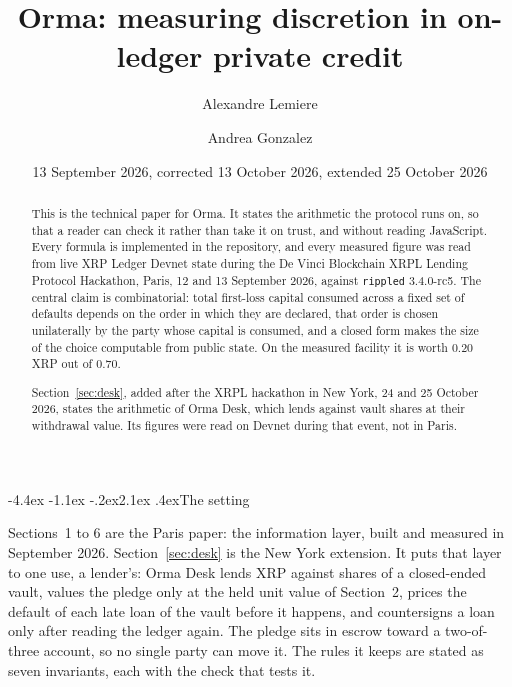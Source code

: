\documentclass[11pt]{article}
\title{Orma: measuring discretion in on-ledger private credit}
\author{Alexandre Lemiere \and Andrea Gonzalez}
\date{13 September 2026, corrected 13 October 2026, extended 25 October 2026}
\makeatletter
\renewcommand\section{\@startsection{section}{1}{\z@}%
  {-4.4ex \@plus -1.1ex \@minus -.2ex}{2.1ex \@plus .4ex}{\normalfont\Large\bfseries}}
\theoremstyle{orma}
\theoremstyle{ormaupright}
\makeatother
\begin{document}
\maketitle

\begin{abstract}
\noindent
This is the technical paper for Orma. It states the arithmetic the protocol runs on, so that
a reader can check it rather than take it on trust, and without reading JavaScript. Every formula is implemented in the repository, and every
measured figure was read from live XRP Ledger Devnet state during the De Vinci Blockchain
XRPL Lending Protocol Hackathon, Paris, 12 and 13 September 2026, against \texttt{rippled}
3.4.0-rc5. The central claim is combinatorial: total first-loss capital consumed across a
fixed set of defaults depends on the order in which they are declared, that order is chosen
unilaterally by the party whose capital is consumed, and a closed form makes the size of the
choice computable from public state. On the measured facility it is worth $0.20$ XRP out of
$0.70$.

Section~\ref{sec:desk}, added after the XRPL hackathon in New York, 24 and 25 October 2026,
states the arithmetic of Orma Desk, which lends against vault shares at their withdrawal
value. Its figures were read on Devnet during that event, not in Paris.
\end{abstract}

\clearpage

\section{The setting}

Sections~1 to 6 are the Paris paper: the information layer, built and measured in September
2026. Section~\ref{sec:desk} is the New York extension. It puts that layer to one use, a
lender's: Orma Desk lends XRP against shares of a closed-ended vault, values the pledge only
at the held unit value of Section~2, prices the default of each late loan of the vault before
it happens, and countersigns a loan only after reading the ledger again. The pledge sits in
escrow toward a two-of-three account, so no single party can move it. The rules it keeps
are stated as seven invariants, each with the check that tests it.
\end{document}
